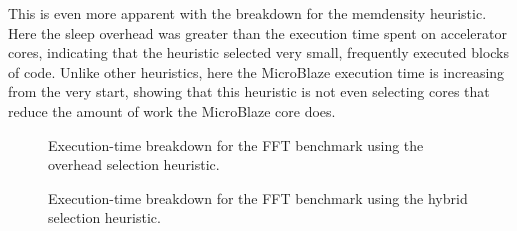 \documentclass{UoYCSproject}
\begin{document}
This is even more apparent with the breakdown for the memdensity heuristic. Here the sleep overhead was greater than the
execution time spent on accelerator cores, indicating that the heuristic selected very small, frequently executed blocks of code.
Unlike other heuristics, here the MicroBlaze execution time is increasing from the very start, showing that this heuristic
is not even selecting cores that reduce the amount of work the MicroBlaze core does.

\begin{figure}[H]
\caption{Execution-time breakdown for the FFT benchmark using the overhead selection heuristic.}
\label{fig:breakdowOverheadFFT}
\end{figure}

\begin{figure}[H]
\caption{Execution-time breakdown for the FFT benchmark using the hybrid selection heuristic.}
\label{fig:breakdownHybridFFT}
\end{figure}
\end{document}
